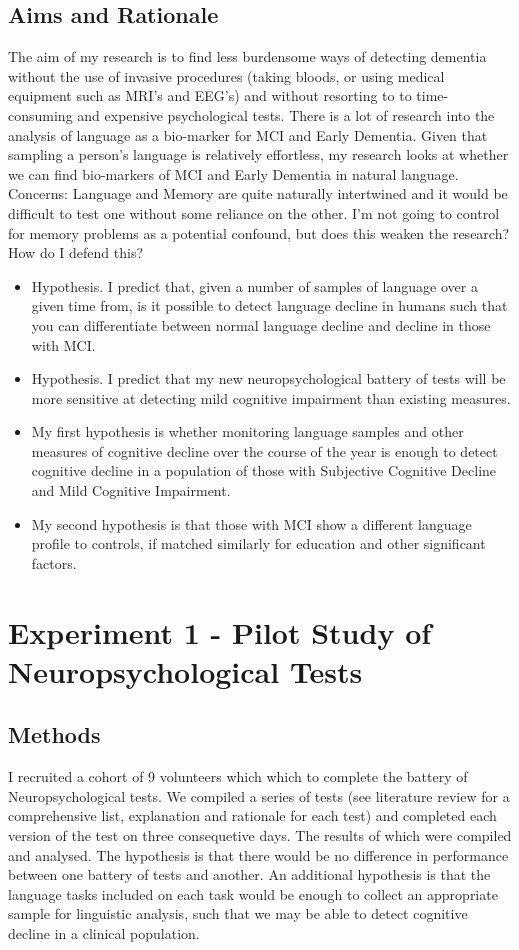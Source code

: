 \documentclass{article}
\begin{document}
\subsection{Aims and Rationale}
The aim of my research is to find less burdensome ways of detecting dementia without the use of invasive procedures (taking bloods, or using medical equipment such as MRI's and EEG's) 	and without resorting to to time-consuming and expensive psychological tests. There is a lot of research into the analysis of language as a bio-marker for MCI and Early Dementia. Given 			that sampling a person's language is relatively effortless, my research looks at whether we can find bio-markers of MCI and Early Dementia in natural language.\newline
Concerns: Language and Memory are quite naturally intertwined and it would be difficult to test one without some reliance on the other. I'm not going to control for memory problems as a 			potential confound, but does this weaken the research? How do I defend this? \newline
\begin{itemize}
	\item Hypothesis. I predict that, given a number of samples of language over a given time from, is it possible to detect language decline in humans such that you can differentiate between normal language decline and decline in those with MCI.
	\item Hypothesis. I predict that my new neuropsychological battery of tests will be more sensitive at detecting mild cognitive impairment than existing measures.
	\item My first hypothesis is whether monitoring language samples and other measures of cognitive decline over the course of the year is enough to detect cognitive decline in a population of those with Subjective Cognitive Decline and Mild Cognitive Impairment.
	\item My second hypothesis is that those with MCI show a different language profile to controls, if matched similarly for education and other significant factors.
\end{itemize}	
\section{Experiment 1 - Pilot Study of Neuropsychological Tests}
\subsection{Methods}
I recruited a cohort of 9 volunteers which which to complete the battery of Neuropsychological tests. We compiled a series of tests (see literature review for a comprehensive list, explanation and rationale for each test) and completed each version of the test on three consequetive days. The results of which were compiled and analysed. The hypothesis is that there would be no difference in performance between one battery of tests and another. An additional hypothesis is that the language tasks included on each task would be enough to collect an appropriate sample for linguistic analysis, such that we may be able to detect cognitive decline in a clinical population. \newline
\par
\end{document}
